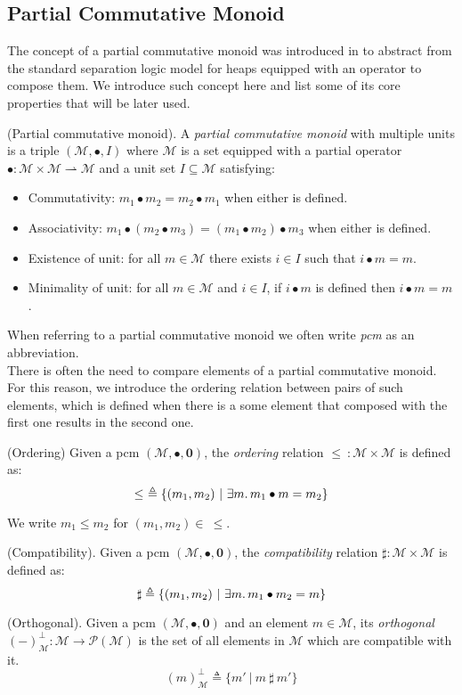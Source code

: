 \subsection{Partial Commutative Monoid}

The concept of a partial commutative monoid was introduced in \cite{sepalgebra} to abstract from the standard separation logic model for heaps equipped with an operator to compose them. We introduce such concept here and list some of its core properties that will be later used.

\begin{defn}
	(Partial commutative monoid).
	A \emph{partial commutative monoid} with multiple units \cite{views} is a triple $(\mathcal{M}, \bullet, I)$ where $\mathcal{M}$ is a set equipped with a partial operator $\bullet : \mathcal{M} \times \mathcal{M} \rightharpoonup \mathcal{M}$ and a unit set $I \subseteq \mathcal{M}$ satisfying:
	\begin{itemize}
		\item Commutativity: $m_1 \bullet m_2 = m_2 \bullet m_1$ when either is defined.
		\item Associativity: $m_1 \bullet (m_2 \bullet m_3) = (m_1 \bullet m_2) \bullet m_3$ when either is defined.
		\item Existence of unit: for all $m \in \mathcal{M}$ there exists $i \in I$ such that $i \bullet m = m$.
		\item Minimality of unit: for all $m \in \mathcal{M}$ and $i \in I$, if $i \bullet m$ is defined then $i \bullet m = m$.
	\end{itemize}
\end{defn}
When referring to a partial commutative monoid we often write \emph{pcm} as an abbreviation. \\

There is often the need to compare elements of a partial commutative monoid. For this reason, we introduce the ordering relation between pairs of such elements, which is defined when there is a some element that composed with the first one results in the second one.
\begin{defn}
	(Ordering)
	Given a pcm $(\mathcal{M}, \bullet, \mathbf{0})$, the \emph{ordering} relation $\leq\ : \mathcal{M} \times \mathcal{M}$ is defined as:
\[
	\leq\ \triangleq \{ (m_1, m_2)\ |\ \exists m \ldotp m_1 \bullet m = m_2 \}
\]
\end{defn}
We write $m_1 \leq m_2$ for $(m_1, m_2) \in\ \leq$.

\begin{defn}
	(Compatibility).
	Given a pcm $(\mathcal{M}, \bullet, \mathbf{0})$, the \emph{compatibility} relation $\sharp : \mathcal{M} \times \mathcal{M}$ is defined as:
\[
	\sharp \triangleq \{ (m_1, m_2)\ |\ \exists m \ldotp m_1 \bullet m_2 = m \}
\]
\end{defn}

\begin{defn}
	(Orthogonal).
	Given a pcm $(\mathcal{M}, \bullet, \mathbf{0})$ and an element $m \in \mathcal{M}$, its \emph{orthogonal} $(-)^\bot_\mathcal{M} : \mathcal{M} \rightarrow \mathcal{P}(\mathcal{M})$ is the set of all elements in $\mathcal{M}$ which are compatible with it.
\[
	(m)^\bot_\mathcal{M} \triangleq \{m'\ |\ m\ \sharp\ m' \}
\]
\end{defn}